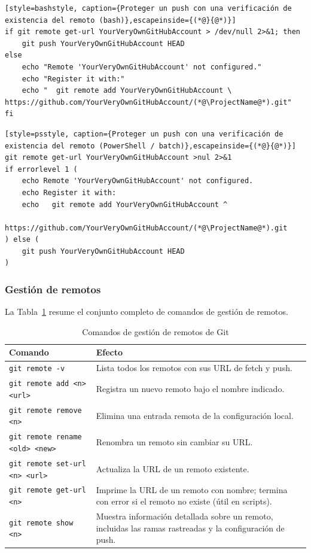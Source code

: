 \begin{lstlisting}[style=bashstyle, caption={Proteger un push con una verificación de existencia del remoto (bash)},escapeinside={(*@}{@*)}]
if git remote get-url YourVeryOwnGitHubAccount > /dev/null 2>&1; then
    git push YourVeryOwnGitHubAccount HEAD
else
    echo "Remote 'YourVeryOwnGitHubAccount' not configured."
    echo "Register it with:"
    echo "  git remote add YourVeryOwnGitHubAccount \
https://github.com/YourVeryOwnGitHubAccount/(*@\ProjectName@*).git"
fi
\end{lstlisting}

\begin{lstlisting}[style=psstyle, caption={Proteger un push con una verificación de existencia del remoto (PowerShell / batch)},escapeinside={(*@}{@*)}]
git remote get-url YourVeryOwnGitHubAccount >nul 2>&1
if errorlevel 1 (
    echo Remote 'YourVeryOwnGitHubAccount' not configured.
    echo Register it with:
    echo   git remote add YourVeryOwnGitHubAccount ^
        https://github.com/YourVeryOwnGitHubAccount/(*@\ProjectName@*).git
) else (
    git push YourVeryOwnGitHubAccount HEAD
)
\end{lstlisting}

\subsubsection{Gestión de remotos}

La Tabla~\ref{tab:git-remote-commands} resume el conjunto completo de comandos
de gestión de remotos.

\begin{table}[h]
\centering
\caption{Comandos de gestión de remotos de Git}
\label{tab:git-remote-commands}
\begin{tabular}{lp{8.5cm}}
\toprule
Comando & Efecto \\
\midrule
\texttt{git remote -v} &
  Lista todos los remotos con sus URL de fetch y push. \\
\texttt{git remote add <n> <url>} &
  Registra un nuevo remoto bajo el nombre indicado. \\
\texttt{git remote remove <n>} &
  Elimina una entrada remota de la configuración local. \\
\texttt{git remote rename <old> <new>} &
  Renombra un remoto sin cambiar su URL. \\
\texttt{git remote set-url <n> <url>} &
  Actualiza la URL de un remoto existente. \\
\texttt{git remote get-url <n>} &
  Imprime la URL de un remoto con nombre; termina con error si
  el remoto no existe (útil en scripts). \\
\texttt{git remote show <n>} &
  Muestra información detallada sobre un remoto, incluidas
  las ramas rastreadas y la configuración de push. \\
\bottomrule
\end{tabular}
\end{table}


